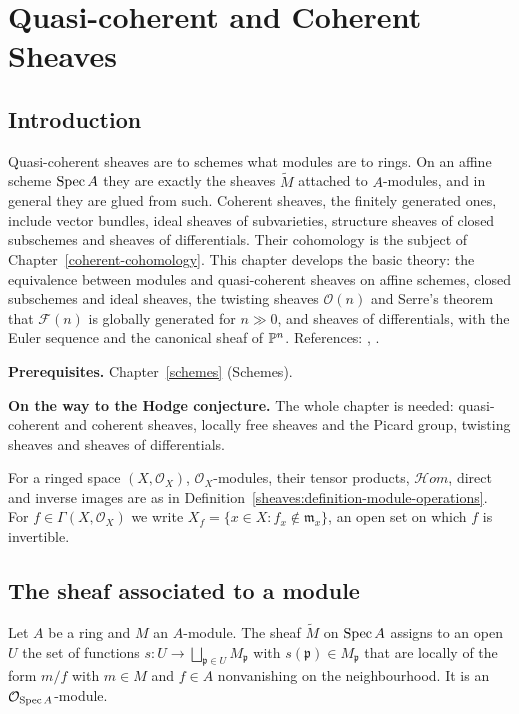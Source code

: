 \chapter{Quasi-coherent and Coherent Sheaves}\label{coherent-sheaves}

\section{Introduction}\label{coherent-sheaves:section-introduction}

Quasi-coherent sheaves are to schemes what modules are to rings. On an affine scheme $\operatorname{Spec} A$ they are exactly the sheaves $\widetilde M$ attached
to $A$-modules, and in general they are glued from such. Coherent sheaves, the finitely generated ones, include vector bundles, ideal sheaves of
subvarieties, structure sheaves of closed subschemes and sheaves of differentials. Their cohomology is the subject of
Chapter~\ref{coherent-cohomology}. This chapter develops the basic theory: the equivalence between modules and quasi-coherent sheaves on affine
schemes, closed subschemes and ideal sheaves, the twisting sheaves $\mathcal{O}(n)$ and Serre's theorem that $\mathcal{F}(n)$ is globally generated
for $n \gg 0$, and sheaves of differentials, with the Euler sequence and the canonical sheaf of $\mathbb{P}^n$. References:
\cite[Sections II.5 and II.8]{hartshorne-ag}, \cite{stacks-project}.

\noindent\textbf{Prerequisites.} Chapter~\ref{schemes} (Schemes).

\noindent\textbf{On the way to the Hodge conjecture.} The whole chapter is needed: quasi-coherent and coherent sheaves, locally free sheaves and the Picard group, twisting sheaves and sheaves of
differentials.

For a ringed space $(X, \mathcal{O}_X)$, $\mathcal{O}_X$-modules, their tensor products, $\mathcal{H}om$, direct and inverse images are as in
Definition~\ref{sheaves:definition-module-operations}. For $f \in \Gamma(X, \mathcal{O}_X)$ we write $X_f = \{x \in X : f_x \notin \mathfrak{m}_x\}$, an open
set on which $f$ is invertible.

\section{The sheaf associated to a module}\label{coherent-sheaves:section-tilde}

\begin{definition}\label{coherent-sheaves:definition-tilde}
Let $A$ be a ring and $M$ an $A$-module. The sheaf $\widetilde M$ on $\operatorname{Spec} A$ assigns to an open $U$ the set of functions
$s \colon U \to \bigsqcup_{\mathfrak{p} \in U}M_\mathfrak{p}$ with $s(\mathfrak{p}) \in M_\mathfrak{p}$ that are locally of the form $m/f$ with $m \in M$ and $f \in A$
nonvanishing on the neighbourhood. It is an $\mathcal{O}_{\operatorname{Spec} A}$-module.
\end{definition}

